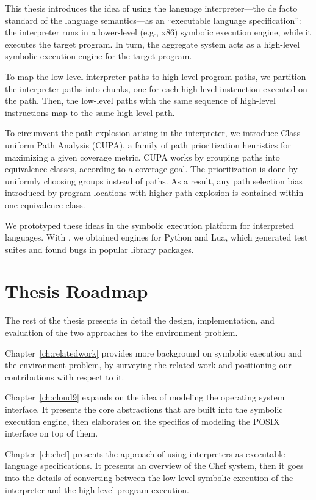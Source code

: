 This thesis introduces the idea of using the language interpreter---the de facto standard of the language semantics---as an ``executable language specification'': the interpreter runs in a lower-level (e.g., x86) symbolic execution engine, while it executes the target program.  In turn, the aggregate system acts as a high-level symbolic execution engine for the target program.

To map the low-level interpreter paths to high-level program paths, we partition the interpreter paths into chunks, one for each high-level instruction executed on the path. Then, the low-level paths with the same sequence of high-level instructions map to the same high-level path.

To circumvent the path explosion arising in the interpreter, we introduce Class-uniform Path Analysis (CUPA), a family of path prioritization heuristics for maximizing a given coverage metric.
%
CUPA works by grouping paths into equivalence classes, according to a coverage goal.  The prioritization is done by uniformly choosing groups instead of paths.  As a result, any path selection bias introduced by program locations with higher path explosion is contained within one equivalence class.

We prototyped these ideas in the \chef symbolic execution platform for interpreted languages.  With \chef, we obtained engines for Python and Lua, which generated test suites and found bugs in popular library packages.


\section{Thesis Roadmap}

The rest of the thesis presents in detail the design, implementation, and evaluation of the two approaches to the environment problem.

Chapter~\ref{ch:relatedwork} provides more background on symbolic execution and the environment problem, by surveying the related work and positioning our contributions with respect to it.

Chapter~\ref{ch:cloud9} expands on the idea of modeling the operating system interface.  It presents the core abstractions that are built into the symbolic execution engine, then elaborates on the specifics of modeling the POSIX interface on top of them.

Chapter~\ref{ch:chef} presents the approach of using interpreters as executable language specifications.  It presents an overview of the Chef system, then it goes into the details of converting between the low-level symbolic execution of the interpreter and the high-level program execution.

